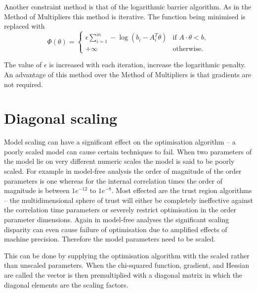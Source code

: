 Another constraint method is that of the logarithmic barrier algorithm.
As in the Method of Multipliers this method is iterative.
The function being minimised is replaced with
\begin{equation}
  \Phi(\theta) = \begin{cases}
    \epsilon \sum_{i=1}^m -\log(b_i - A_i^T\theta) & \textrm{if } A \cdot \theta < b, \\
    +\infty & \textrm{otherwise}.
    \end{cases}
\end{equation}

The value of $\epsilon$ is increased with each iteration, increase the logarithmic penalty.
An advantage of this method over the Method of Multipliers is that gradients are not required.




\section{Diagonal scaling}
\label{sect: diagonal scaling}

Model scaling can have a significant effect on the optimisation algorithm -- a poorly scaled model can cause certain techniques to fail.  When two parameters of the model lie on very different numeric scales the model is said to be poorly scaled.  For example in model-free analysis the order of magnitude of the order parameters is one whereas for the internal correlation times the order of magnitude is between $1e^{-12}$ to $1e^{-8}$.  Most effected are the trust region algorithms -- the multidimensional sphere of trust will either be completely ineffective against the correlation time parameters or severely restrict optimisation in the order parameter dimensions.  Again in model-free analyses the significant scaling disparity can even cause failure of optimisation due to amplified effects of machine precision.  Therefore the model parameters need to be scaled.

This can be done by supplying the optimisation algorithm with the scaled rather than unscaled parameters.  When the chi-squared function, gradient, and Hessian are called the vector is then premultiplied with a diagonal matrix in which the diagonal elements are the scaling factors.
